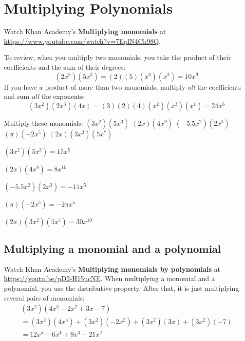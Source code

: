 \chapter{Multiplying Polynomials}

Watch Khan Academy's \textbf{Multiplying monomials} at \url{https://www.youtube.com/watch?v=7EplN4Ch98Q}.

To review, when you multiply two monomials, you take the product of
their coefficients and the sum of their degrees:
\begin{equation*}
  (2x^6)(5x^3) = (2)(5)(x^6)(x^3) = 10x^9
\end{equation*}
If you have a product of more than two monomials, multiply \emph{all}
the coefficients and sum \emph{all} the exponents:
\begin{equation*}
  (3x^2)(2x^3)(4x) = (3)(2)(4)(x^2)(x^3)(x^1) = 24x^6
\end{equation*}

\begin{Exercise}[title={Multiplying monomials}, label=multmonomials]
Multiply these monomials:
  \Question $(3x^2)(5x^3)$
\vspace{20mm}
  \Question $(2x)(4x^9)$
\vspace{20mm}
  \Question $(-5.5x^2)(2x^3)$
\vspace{20mm}
  \Question $(\pi)(-2x^5)$
\vspace{20mm}
  \Question $(2x)(3x^2)(5x^7)$
\vspace{20mm}
\end{Exercise}
\begin{Answer}[ref=multmonomials]
  $(3x^2)(5x^3) = 15x^5$
  
  $(2x)(4x^9) = 8x^{10}$
  
  $(-5.5x^2)(2x^3) = -11x^5$

  $(\pi)(-2x^5) = -2\pi x^5$
  
  $(2x)(3x^2)(5x^7) = 30x^{10}$
\end{Answer}

\section{Multiplying a monomial and a polynomial}

Watch Khan Academy's \textbf{Multiplying monomials by polynomials} at \url{https://youtu.be/pD2-H15ucNE}.
When multiplying a monomial and a polynomial, you use the distributive property. After that, it is just multiplying several pairs of monomials:
\begin{multline*}
  (3x^2)(4x^3 - 2x^2 + 3x - 7) \\
  = (3x^2)(4x^3) + (3x^2)(-2x^2) + (3x^2)(3x) + (3x^2)(-7) \\
  = 12x^5 - 6x^4 + 9x^3 -21x^2
\end{multline*}

